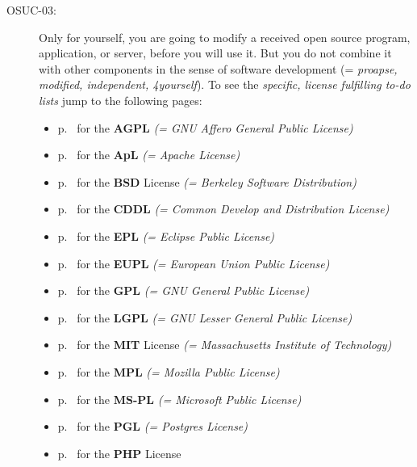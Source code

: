 \begin{description}
\item[OSUC-03:]\label{OSUC-03-DEF} Only for yourself, you are going to modify a
received open source program, application, or server, before you will use it.
But you do not combine it with other components in the sense of software
development (= \textit{proapse, modified, independent, 4yourself}).
To see the \textit{specific, license fulfilling to-do lists} jump to the
following pages:
   \begin{itemize}
    \item p.\ \pageref{OSUC-03-AGPL} for the \textbf{AGPL}
      \textit{(= GNU Affero General Public License)} 
    \item p.\ \pageref{OSUC-03-Apache20} for the \textbf{ApL}
      \textit{(= Apache License)}
    \item p.\ \pageref{OSUC-03-BSD} for the \textbf{BSD} License
      \textit{(= Berkeley Software Distribution)}
    \item p.\ \pageref{OSUC-03-CDDL} for the \textbf{CDDL}
      \textit{(= Common Develop and Distribution License)}  
    \item p.\ \pageref{OSUC-03-EPL} for the \textbf{EPL}
      \textit{(= Eclipse Public License)}     
    \item p.\ \pageref{OSUC-03-EUPL} for the \textbf{EUPL}
      \textit{(= European Union Public License)} 
    \item p.\ \pageref{OSUC-03-GPL} for the \textbf{GPL}
       \textit{(= GNU General Public License)} 
    \item p.\ \pageref{OSUC-03-LGPL} for the \textbf{LGPL}
      \textit{(= GNU Lesser General Public License)}           
    \item p.\ \pageref{OSUC-03-MIT} for the \textbf{MIT} License
       \textit{(= Massachusetts Institute of Technology)} 
    \item p.\ \pageref{OSUC-03-MPL} for the \textbf{MPL}
      \textit{(= Mozilla Public License)}     
    \item p.\ \pageref{OSUC-03-MS-PL} for the \textbf{MS-PL}
      \textit{(= Microsoft Public License)} 
    \item p.\ \pageref{OSUC-03-PGL} for the \textbf{PGL}
      \textit{(= Postgres License)} 
    \item p.\ \pageref{OSUC-03-PHP} for the \textbf{PHP} License 
  \end{itemize}


\end{description}
